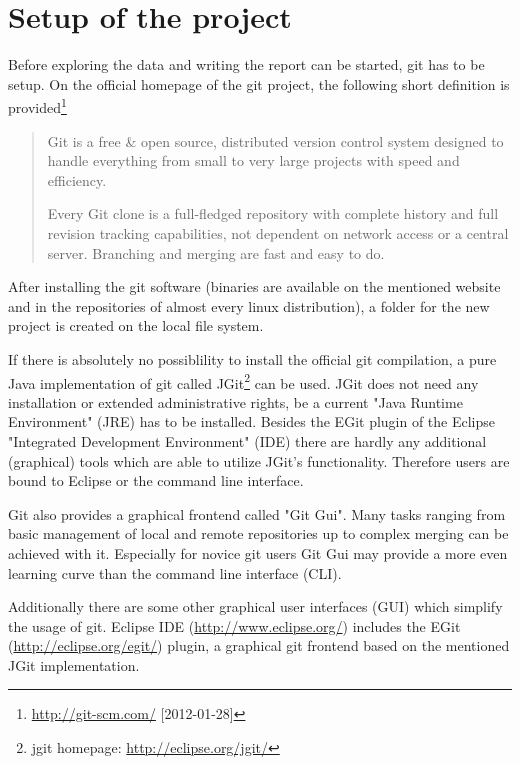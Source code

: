 \documentclass{ifacconf}
\begin{document}
\section{Setup of the project}

Before exploring the data and writing the report can be started, git has to be setup.
On the official homepage of the git project, the following short definition 
is provided\footnote{\url{http://git-scm.com/} [2012-01-28]}

\begin{quotation}
Git is a free \& open source, distributed version control 
system designed to handle everything from small to very large projects with speed and efficiency.

Every Git clone is a full-fledged repository with complete 
history and full revision tracking capabilities, not 
dependent on network access or a central server. Branching and merging are fast and easy to do.
\end{quotation}

After installing the git software (binaries are available on the mentioned website and in 
the repositories of almost every linux distribution), a folder for the new project is 
created on the local file system. 

If there is absolutely no possiblility to install
the official git compilation, a pure Java implementation of git called JGit\footnote{jgit homepage: 
\url{http://eclipse.org/jgit/}} can be used. JGit does not need any installation or
extended administrative rights, be a current "Java Runtime Environment" (JRE) has
to be installed. Besides the EGit plugin of the Eclipse "Integrated Development 
Environment" (IDE) there are hardly any additional (graphical) tools which are able
to utilize JGit's functionality. Therefore users are bound to Eclipse or the 
command line interface.

Git also provides a graphical frontend called "Git Gui". Many tasks ranging from
basic management of local and remote repositories up to complex merging can be
achieved with it. Especially for novice git users Git Gui may provide a more even
learning curve than the command line interface (CLI).

Additionally there are some other graphical user interfaces (GUI) which
simplify the usage of git. Eclipse IDE (\url{http://www.eclipse.org/}) includes the EGit
(\url{http://eclipse.org/egit/}) plugin, a graphical git frontend based on
the mentioned JGit implementation. 
\end{document}
